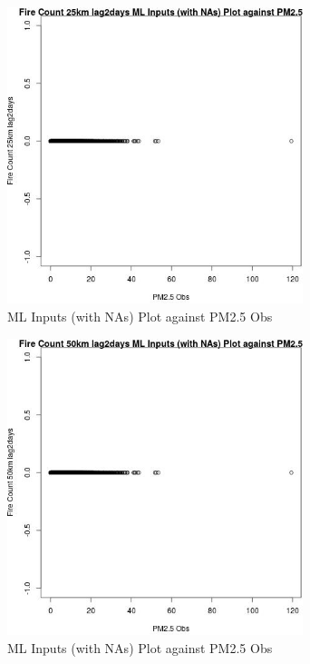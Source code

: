 \begin{figure} 
\centering  
\includegraphics[width=0.77\textwidth]{Code_Outputs/Report_ML_input_PM25_Step4_part_e_de_duplicated_aves_compiled_2019-05-18wNAs_Fire_Count_25km_lag2daysvPM25_Obs.jpg} 
\caption{\label{fig:Report_ML_input_PM25_Step4_part_e_de_duplicated_aves_compiled_2019-05-18wNAsFire_Count_25km_lag2daysvPM25_Obs}ML Inputs (with NAs) Plot against PM2.5 Obs} 
\end{figure} 
 

\clearpage 

\begin{figure} 
\centering  
\includegraphics[width=0.77\textwidth]{Code_Outputs/Report_ML_input_PM25_Step4_part_e_de_duplicated_aves_compiled_2019-05-18wNAs_Fire_Count_50km_lag2daysvPM25_Obs.jpg} 
\caption{\label{fig:Report_ML_input_PM25_Step4_part_e_de_duplicated_aves_compiled_2019-05-18wNAsFire_Count_50km_lag2daysvPM25_Obs}ML Inputs (with NAs) Plot against PM2.5 Obs} 
\end{figure} 
 

